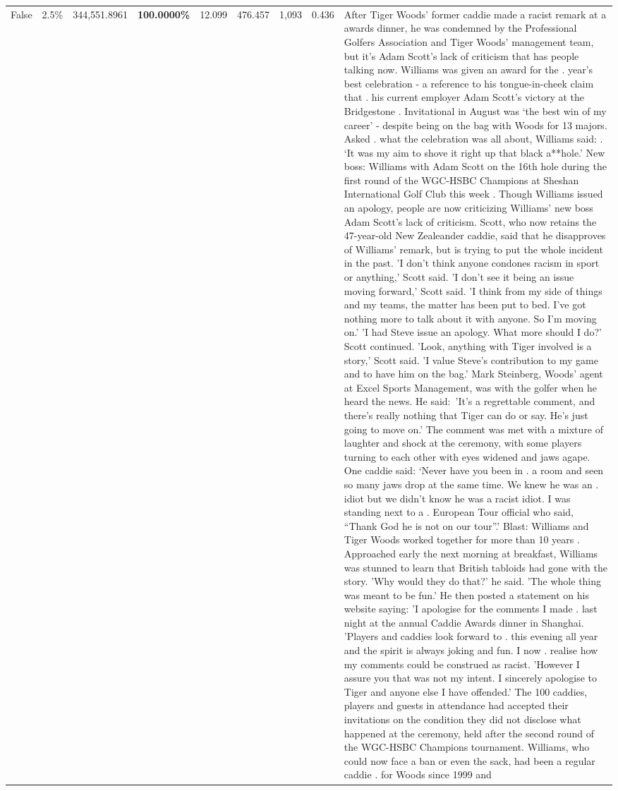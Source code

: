 \begin{table}[H]
\begin{tabular}{lllrlllll}
False & 2.5\% & 344,551.8961 & \bfseries \color{red} 100.0000\% & 12.099 & 476.457 & 1,093 & 0.436 & After Tiger Woods' former caddie made a racist remark at a awards dinner, he was condemned by the Professional Golfers Association and Tiger Woods' management team, but it's Adam Scott's lack of criticism that has people talking now. Williams was given an award for the . year’s best celebration - a reference to his tongue-in-cheek claim that . his current employer Adam Scott’s victory at the Bridgestone . Invitational in August was ‘the best win of my career’ - despite being on the bag with Woods for 13 majors. Asked . what the celebration was all about, Williams said: . ‘It was my aim to shove it right up that black a**hole.’ New boss: Williams with Adam Scott  on the 16th hole during the first round of the WGC-HSBC Champions at Sheshan International Golf Club this week . Though Williams issued an apology, people are now criticizing Williams' new boss Adam Scott's lack of criticism. Scott, who now retains the 47-year-old New Zealeander caddie, said that he disapproves of Williams' remark, but is trying to put the whole incident in the past. 'I don't think anyone condones racism in sport or anything,' Scott said. 'I don't see it being an issue moving forward,' Scott said. 'I think from my side of things and my teams, the matter has been put to bed. I've got nothing more to talk about it with anyone. So I'm moving on.' 'I had Steve issue an apology. What more should I do?' Scott continued. 'Look, anything with Tiger involved is a story,' Scott said. 'I value Steve's contribution to my game and to have him on the bag.' Mark Steinberg, Woods' agent at Excel Sports Management, was with the golfer when he heard the news. He said: 'It's a regrettable comment, and there's really nothing that Tiger can do or say. He's just going to move on.' The comment was met with a mixture of laughter and shock at the ceremony, with some players turning to each other with eyes widened and jaws agape. One caddie said: ‘Never have you been in . a room and seen so many jaws drop at the same time. We knew he was an . idiot but we didn’t know he was a racist idiot. I was standing next to a . European Tour official who said, “Thank God he is not on our tour”.’ Blast: Williams and Tiger Woods worked together for more than 10 years . Approached early the next morning at breakfast, Williams was stunned to learn that British tabloids had gone with the story. 'Why would they do that?' he said. 'The whole thing was meant to be fun.' He then posted a statement on his website saying: 'I apologise for the comments I made . last night at the annual Caddie Awards dinner in Shanghai. 'Players and caddies look forward to . this evening all year and the spirit is always joking and fun. I now . realise how my comments could be construed as racist. 'However I assure you that was not my intent. I sincerely apologise to Tiger and anyone else I have offended.' The 100 caddies, players and guests in attendance had accepted their invitations on the condition they did not disclose what happened at the ceremony, held after the second round of the WGC-HSBC Champions tournament. Williams, who could now face a ban or even the sack, had been a regular caddie . for Woods since 1999 and 
\end{tabular}
\end{table}
